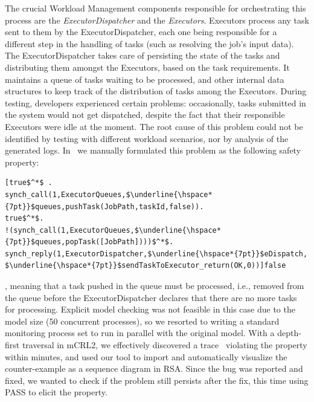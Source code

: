 \documentclass[letter]{llncs}
\begin{document}
The crucial Workload Management components responsible for orchestrating this process are the \emph{ExecutorDispatcher} and 
the \emph{Executors}. Executors process any task sent to them by the ExecutorDispatcher, each one being responsible for a different step in the handling of tasks
(such as resolving the job's input data).
The ExecutorDispatcher takes care of persisting the state of the tasks and distributing them amongst the Executors, based on the
task requirements. It maintains a queue of tasks waiting to be processed, and other internal data structures to keep track
of the distribution of tasks among the Executors.
During testing, developers experienced certain problems: occasionally, tasks submitted in the system would not get dispatched, despite the fact that their responsible Executors
were idle at the moment. The root cause of this problem could not be identified by testing  with different workload scenarios, nor by analysis of the 
generated logs. 
In~\cite{DBLP:dblp_conf/nfm/RemenskaTWHVCB13} we manually formulated this problem as the following safety property:
\begin{lstlisting}[basicstyle=\sffamily\fontsize{7}{8}\selectfont,showspaces=false,showstringspaces=false,showtabs=false,mathescape]
[true$^*$ .
synch_call(1,ExecutorQueues,$\underline{\hspace*{7pt}}$queues,pushTask(JobPath,taskId,false)).
true$^*$.
!(synch_call(1,ExecutorQueues,$\underline{\hspace*{7pt}}$queues,popTask([JobPath])))$^*$.
synch_reply(1,ExecutorDispatcher,$\underline{\hspace*{7pt}}$eDispatch,
$\underline{\hspace*{7pt}}$sendTaskToExecutor_return(OK,0))]false 
\end{lstlisting} 
\vspace{-5 pt}
, meaning that a task pushed in the queue must be processed, i.e., removed from the queue before the ExecutorDispatcher
declares that there are no more tasks for processing.
Explicit model checking was not feasible in this case due to the model size (50 concurrent processes),
so we resorted to writing a standard monitoring process set to run in parallel with the original model.
With a depth-first traversal in mCRL2, we effectively discovered a trace~\cite{DBLP:dblp_conf/nfm/RemenskaTWHVCB13} violating the property within minutes, and
used our tool to import and automatically visualize the counter-example as a sequence diagram in RSA.
Since the bug was reported and fixed, we wanted to check if the problem still persists after the fix, this time using PASS to 
elicit the property.
\vspace{-12 pt}
\label{sec:CaseStudy}
\end{document}
